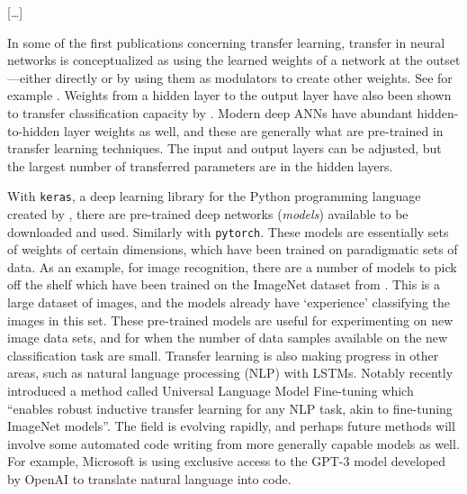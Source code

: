 \documentclass[11pt, oneside]{article}   	%
\begin{document}
[\dots]


In some of the first publications concerning transfer learning, transfer in neural networks is conceptualized as using the learned weights of a network at the outset---either directly or by using them as modulators to create other weights.  See for example \citet{Pratt1991,Pratt1993}.  Weights from a hidden layer to the output layer have also been shown to transfer classification capacity by \citet[p. 322]{Sharkeyetal1993}.  Modern deep ANNs have abundant hidden-to-hidden layer weights as well, and these are generally what are pre-trained in transfer learning techniques.  The input and output layers can be adjusted, but the largest number of transferred parameters are in the hidden layers.



With \texttt{keras}, a deep learning library for the Python programming language created by \citet{Chollet2015keras}, there are pre-trained deep networks (\emph{models}) available to be downloaded and used.  Similarly with \texttt{pytorch}.  These models are essentially sets of weights of certain dimensions, which have been trained on paradigmatic sets of data.  As an example, for image recognition, there are a number of models to pick off the shelf which have been trained on the ImageNet dataset from  \citet{Dengetal2009}.  This is a large dataset of images, and the models already have `experience' classifying the images in  this set.  These pre-trained models are useful for experimenting on new image data sets, and for when the number of data samples available on the new classification task are small.  Transfer learning is also making progress in other areas, such as natural language processing (NLP) with LSTMs.  Notably \citet{Ruderetal2018} recently introduced a method called Universal Language Model Fine-tuning which ``enables robust inductive transfer learning for any NLP task, akin to fine-tuning ImageNet models''.  The field is evolving rapidly, and perhaps future methods will involve some automated code writing from more generally capable models as well.  For example, Microsoft is using exclusive access to the GPT-3 model developed by OpenAI \citep{OpenAI_GPT-3} to translate natural language into code.
\end{document}
